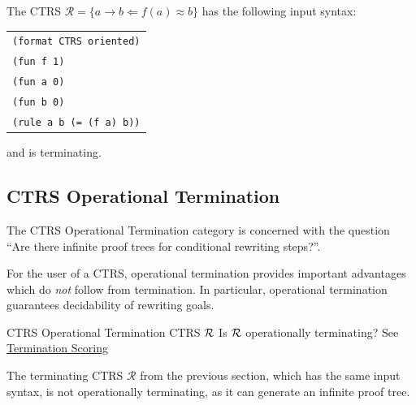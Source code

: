 \begin{example}
The CTRS $\mathcal{R} = \{a \rightarrow b \Leftarrow f(a) \approx b\}$ has the following input syntax:

\begin{center}
\begin{tabular}{l}
\texttt{(format CTRS oriented)} \\
\texttt{(fun f 1)} \\
\texttt{(fun a 0)} \\
\texttt{(fun b 0)} \\
\texttt{(rule a b (= (f a) b))}
\end{tabular}
\end{center}

and is terminating.
\end{example}

\subsection{CTRS Operational Termination}

The CTRS Operational Termination category is concerned with the question 
``Are there infinite proof trees for conditional rewriting steps?''. 

\begin{motivation}
For the user of a CTRS, operational termination provides important advantages which do \emph{not} follow from termination.
%
In particular, operational termination guarantees decidability of rewriting goals.
\end{motivation}
\begin{formalproblem}
  {CTRS Operational Termination}
  {CTRS $\mathcal{R}$}
  {Is $\mathcal{R}$ operationally terminating?}
  {See \hyperref[scoring_termination]{Termination Scoring}}
\end{formalproblem}

\begin{example}
The terminating CTRS $\mathcal{R}$ from the previous section, which has the same input syntax, is not operationally terminating, as it can generate an infinite proof tree.
\end{example}
